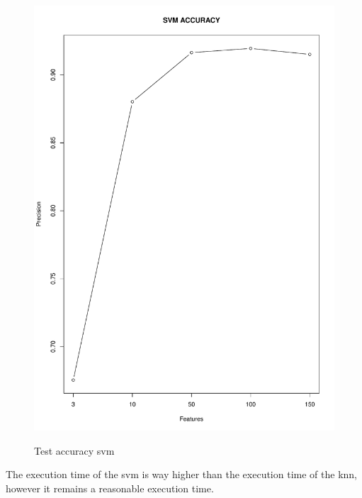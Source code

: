 \documentclass{article}
\begin{document}
\begin{figure}[H]
\begin{adjustwidth}{-4cm}{-4cm}
{    \includegraphics[scale=0.3]{../svm_accuracy_rgb.pdf}  
     }
     \centering
     \caption{Test accuracy svm}
      \end{adjustwidth}
   \end{figure}

\noindent The execution time of the svm is way higher than the execution time of the knn, however it remains a reasonable execution time.
   
\end{document}
